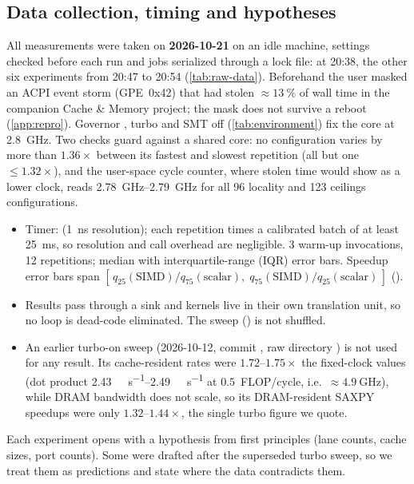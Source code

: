 \subsection{Data collection, timing and hypotheses}
All measurements were taken on \textbf{2026-10-21} on an idle machine, settings checked before each
run and jobs serialized through a lock file:  at 20:38, the other six experiments
from 20:47 to 20:54 (\cref{tab:raw-data}). Beforehand the user masked an ACPI event storm
(GPE~0x42) that had stolen $\approx\SI{13}{\percent}$ of wall time in the companion Cache \& Memory
project; the mask does not survive a reboot (\cref{app:repro}). Governor \sysGovernor{}, turbo
\sysTurbo{} and SMT off (\cref{tab:environment}) fix the core at \qty{2.8}{\giga\hertz}. Two checks
guard against a shared core: no configuration varies by more than $1.36\times$ between its fastest
and slowest repetition (all but one $\le1.32\times$), and the user-space cycle counter, where stolen
time would show as a lower clock, reads \qtyrange{2.78}{2.79}{\giga\hertz} for all \num{96} locality
and \num{123} ceilings configurations.
\begin{itemize}
  \item Timer:  (\qty{1}{\nano\second} resolution); each repetition times
        a calibrated batch of at least \qty{25}{\milli\second}, so resolution and call overhead are
        negligible. 3 warm-up invocations, 12 repetitions; median with interquartile-range (IQR)
        error bars. Speedup error bars span
        $[\,q_{25}(\text{SIMD})/q_{75}(\text{scalar}),\; q_{75}(\text{SIMD})/q_{25}(\text{scalar})\,]$
        ().
  \item Results pass through a  sink and kernels live in their own translation unit,
        so no loop is dead-code eliminated. The sweep () is not shuffled.
  \item An earlier turbo-on sweep (2026-10-12, commit , raw directory
        ) is not used for any result. Its cache-resident rates were
        $1.72\text{--}1.75\times$ the fixed-clock values (dot product
        \qtyrange{2.43}{2.49}{\giga\flop\per\second} at $0.5$~FLOP/cycle, i.e.\
        $\approx\qty{4.9}{\giga\hertz}$), while DRAM bandwidth does not scale, so its DRAM-resident
        SAXPY speedups were only $1.32\text{--}1.44\times$, the single turbo figure we quote.
\end{itemize}
Each experiment opens with a hypothesis from first principles (lane counts, cache sizes, port
counts). Some were drafted after the superseded turbo sweep, so we treat them as predictions and
state where the data contradicts them.


